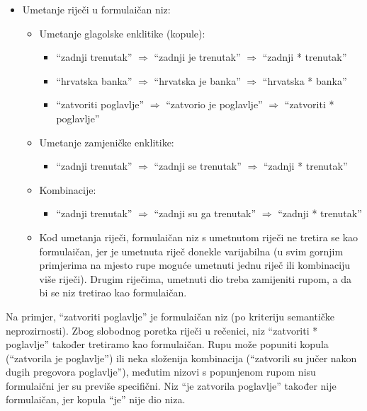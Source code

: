 \documentclass[12pt]{article}
\begin{document}
\begin{itemize}
\item Umetanje riječi u formulaičan niz:
\begin{itemize}
\item Umetanje glagolske enklitike (kopule):
\begin{itemize}
\item ``zadnji trenutak'' $\Rightarrow$ ``zadnji je trenutak'' $\Rightarrow$ ``zadnji * trenutak''
\item ``hrvatska banka'' $\Rightarrow$ ``hrvatska je banka'' $\Rightarrow$ ``hrvatska * banka''
\item ``zatvoriti poglavlje'' $\Rightarrow$ ``zatvorio je poglavlje'' $\Rightarrow$ ``zatvoriti * poglavlje''
\end{itemize} 
\item Umetanje zamjeničke enklitike:
\begin{itemize}
\item ``zadnji trenutak'' $\Rightarrow$ ``zadnji se trenutak'' $\Rightarrow$ ``zadnji * trenutak''
\end{itemize}
\item Kombinacije:
\begin{itemize}
\item ``zadnji trenutak'' $\Rightarrow$ ``zadnji su ga trenutak'' $\Rightarrow$ ``zadnji * trenutak''
\end{itemize}
\item Kod umetanja riječi, formulaičan niz s umetnutom riječi ne tretira se kao formulaičan, jer je
umetnuta riječ donekle varijabilna (u svim gornjim primjerima na mjesto rupe moguće umetnuti
jednu riječ ili kombinaciju više riječi). Drugim riječima, umetnuti dio treba zamijeniti rupom, a
da bi se niz tretirao kao formulaičan.
\end{itemize}
\end{itemize}

Na primjer, ``zatvoriti poglavlje'' je formulaičan niz (po kriteriju semantičke neprozirnosti). Zbog slobodnog
poretka riječi u rečenici, niz ``zatvoriti * poglavlje'' također tretiramo kao formulaičan. Rupu može popuniti
kopula (``zatvorila je poglavlje'') ili neka složenija kombinacija (``zatvorili su jučer nakon dugih pregovora
poglavlje''), međutim nizovi s popunjenom rupom nisu formulaični jer su previše specifični. Niz ``je zatvorila
poglavlje'' također nije formulaičan, jer kopula ``je'' nije dio niza.
\end{document}
